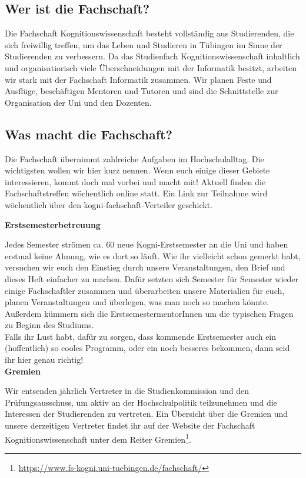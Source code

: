 \subsection{Wer ist die Fachschaft?}
Die Fachschaft Kognitionswissenschaft besteht vollständig aus Studierenden, die sich freiwillig treffen, um das Leben und Studieren in Tübingen im Sinne der Studierenden zu verbessern. Da das Studienfach Kognitionswissenschaft inhaltlich und organisatiorisch viele Überschneidungen mit der Informatik besitzt, arbeiten wir stark mit der Fachschaft Informatik zusammen.
Wir planen Feste und Ausflüge, beschäftigen Mentoren und Tutoren und sind die Schnittstelle zur Organisation der Uni und den Dozenten.

\subsection{Was macht die Fachschaft?}
Die Fachschaft übernimmt zahlreiche Aufgaben im Hochschulalltag. Die wichtigsten wollen wir hier kurz nennen. Wenn euch einige dieser Gebiete interessieren, kommt doch mal vorbei und macht mit! Aktuell finden die Fachschaftstreffen wöchentlich online statt. Ein Link zur Teilnahme wird wöchentlich über den kogni-fachschaft-Verteiler geschickt.

\textbf{Erstsemesterbetreuung}

Jedes Semester strömen ca. 60 neue Kogni-Erstsemester an die Uni und haben erstmal keine Ahnung, wie es dort so läuft. Wie ihr vielleicht schon gemerkt habt, versuchen wir euch den Einstieg durch unsere Veranstaltungen, den Brief und dieses Heft einfacher zu machen. Dafür setzten sich Semester für Semester wieder einige Fachschaftler zusammen und überarbeiten unsere Materialien für euch, planen Veranstaltungen und überlegen, was man noch so machen könnte. Außerdem kümmern sich die ErstsemestermentorInnen um die typischen Fragen zu Beginn des Studiums.\\
Falls ihr Lust habt, dafür zu sorgen, dass kommende Erstsemester auch ein (hoffentlich) so cooles Programm, oder ein noch besseres bekommen, dann seid ihr hier genau richtig!\\

\textbf{Gremien}

Wir entsenden jährlich Vertreter in die Studienkommission und den Prüfungsausschuss, um aktiv an der Hochschulpolitik teilzunehmen und die Interessen der Studierenden zu vertreten. Ein Übersicht über die Gremien und unsere derzeitigen Vertreter findet ihr auf der Website der Fachschaft Kognitionswissenschaft unter dem Reiter Gremien\footnote{\url{https://www.fs-kogni.uni-tuebingen.de/fachschaft/}}. \\	%

